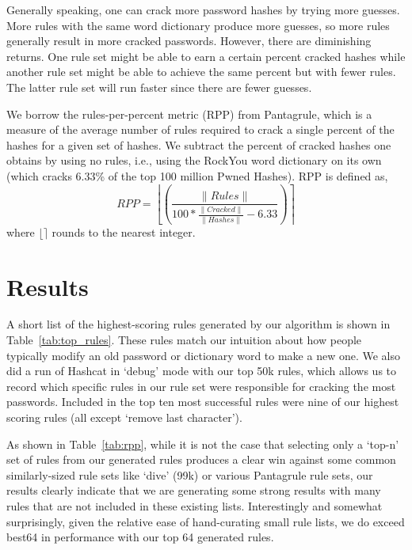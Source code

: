 \documentclass{article}
\begin{document}
Generally speaking, one can crack more password hashes by trying more guesses.
More rules with the same word dictionary produce more guesses, so more rules
generally result in more cracked passwords. However, there are diminishing
returns. One rule set might be able to earn a certain percent cracked hashes
while another rule set might be able to achieve the same percent but with fewer
rules. The latter rule set will run faster since there are fewer guesses.

We borrow the rules-per-percent metric (RPP) from Pantagrule\autocite{pantagrule},
which is a measure of the average number of rules required to crack a single
percent of the hashes for a given set of hashes. We subtract the percent of
cracked hashes one obtains by using no rules, i.e., using the RockYou
word dictionary on its own (which cracks 6.33\% of the top 100 million Pwned
Hashes). RPP is defined as,
\begin{equation*}
RPP =\left\lfloor\left(\frac{\|Rules\|}{100*\frac{\|Cracked\|}{\|Hashes\|} -
6.33}\right)\right\rceil
\end{equation*}
where $\lfloor\rceil$ rounds to the nearest integer.

\section{Results}
\label{sec:results}

A short list of the highest-scoring rules generated by our algorithm is shown
in Table~\ref{tab:top_rules}. These rules match our intuition about how people
typically modify an old password or dictionary word to make a new one. We also
did a run of Hashcat in `debug' mode with our top 50k rules, which allows us to
record which specific rules in our rule set were responsible for cracking the most
passwords. Included in the top ten most successful rules were nine of our
highest scoring rules (all except `remove last character').

As shown in Table~\ref{tab:rpp}, while it is not the case that selecting only a
`top-n' set of rules from our
generated rules produces a clear win against some common similarly-sized
rule sets like `dive' (99k) or various Pantagrule rule sets, our results
clearly indicate that we are generating some strong results with many rules
that are not included in these existing lists.  Interestingly and somewhat
surprisingly, given the relative ease of hand-curating small rule lists,
we do exceed best64 in performance with our top 64 generated rules.
\end{document}
